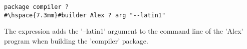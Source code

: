 \begin{lstlisting}
package compiler ?
#\hspace{7.3mm}#builder Alex ? arg "--latin1"
\end{lstlisting}

\noindent The expression adds the \lst'--latin1' argument to the command line
of the \lst'Alex' program when building the \lst'compiler' package.

\newcommand{\itab}[1]{\hspace{0em}\rlap{#1}}
\newcommand{\tab}[1]{\hspace{.1\textwidth}\rlap{#1}}
\newcommand{\ctab}[1]{\hspace{.031\textwidth}\rlap{#1}}
\newcommand{\ptab}[1]{\hspace{.074\textwidth}\rlap{#1}}
\newcommand{\cotab}[1]{\hspace{.064\textwidth}\rlap{#1}}
\newcommand{\ttab}[1]{\hspace{.058\textwidth}\rlap{#1}}
\newcommand{\tytab}[1]{\hspace{.052\textwidth}\rlap{#1}}
\newcommand{\atab}[1]{\hspace{.102\textwidth}\rlap{#1}}

